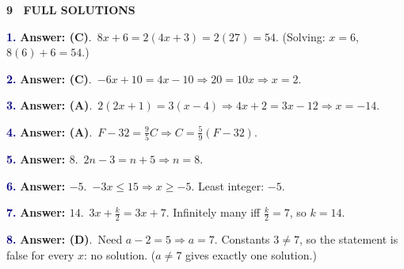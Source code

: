 \documentclass[10pt]{article}
\newcommand{\banner}[1]{\vspace{6pt}\par\noindent\begin{tcolorbox}[enhanced,colback=NAVY,colframe=NAVY,boxrule=0pt,arc=2pt,left=6pt,top=1pt,bottom=1pt,nobeforeafter]\color{white}\bfseries\small\MakeUppercase{#1}\end{tcolorbox}\par\nopagebreak\vspace{2pt}}
\begin{document}
\newpage\banner{9 \textperiodcentered\ Full Solutions}
\begin{minipage}{\linewidth}\textbf{\textcolor{NAVY}{1.}} \textbf{Answer: (C)}.\ $8x+6=2(4x+3)=2(27)=54$. (Solving: $x=6$, $8(6)+6=54$.)\end{minipage}\par\vspace{5pt}
\begin{minipage}{\linewidth}\textbf{\textcolor{NAVY}{2.}} \textbf{Answer: (C)}.\ $-6x+10=4x-10\Rightarrow 20=10x\Rightarrow x=2$.\end{minipage}\par\vspace{5pt}
\begin{minipage}{\linewidth}\textbf{\textcolor{NAVY}{3.}} \textbf{Answer: (A)}.\ $2(2x+1)=3(x-4)\Rightarrow4x+2=3x-12\Rightarrow x=-14$.\end{minipage}\par\vspace{5pt}
\begin{minipage}{\linewidth}\textbf{\textcolor{NAVY}{4.}} \textbf{Answer: (A)}.\ $F-32=\frac95C\Rightarrow C=\frac59(F-32)$.\end{minipage}\par\vspace{5pt}
\begin{minipage}{\linewidth}\textbf{\textcolor{NAVY}{5.}} \textbf{Answer: $8$}.\ $2n-3=n+5\Rightarrow n=8$.\end{minipage}\par\vspace{5pt}
\begin{minipage}{\linewidth}\textbf{\textcolor{NAVY}{6.}} \textbf{Answer: $-5$}.\ $-3x\le15\Rightarrow x\ge-5$. Least integer: $-5$.\end{minipage}\par\vspace{5pt}
\begin{minipage}{\linewidth}\textbf{\textcolor{NAVY}{7.}} \textbf{Answer: $14$}.\ $3x+\frac k2=3x+7$. Infinitely many iff $\frac k2=7$, so $k=14$.\end{minipage}\par\vspace{5pt}
\begin{minipage}{\linewidth}\textbf{\textcolor{NAVY}{8.}} \textbf{Answer: (D)}.\ Need $a-2=5\Rightarrow a=7$. Constants $3\ne7$, so the statement is false for every $x$: no solution. ($a\ne7$ gives exactly one solution.)\end{minipage}\par\vspace{5pt}
\end{document}
